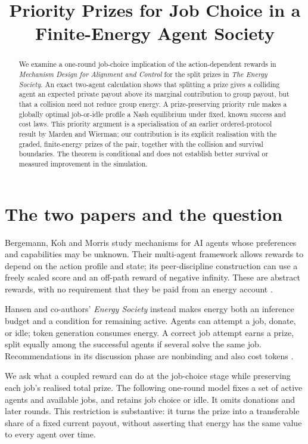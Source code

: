 \documentclass{article}
\title{Priority Prizes for Job Choice in a Finite-Energy Agent Society}
\begin{document}
\maketitle

\begin{abstract}
We examine a one-round job-choice implication of the action-dependent rewards in \emph{Mechanism Design for Alignment and Control} for the split prizes in \emph{The Energy Society}. An exact two-agent calculation shows that splitting a prize gives a colliding agent an expected private payout above its marginal contribution to group payout, but that a collision need not reduce group energy. A prize-preserving priority rule makes a globally optimal job-or-idle profile a Nash equilibrium under fixed, known success and cost laws. This priority argument is a specialisation of an earlier ordered-protocol result by Marden and Wierman; our contribution is its explicit realisation with the graded, finite-energy prizes of the pair, together with the collision and survival boundaries. The theorem is conditional and does not establish better survival or measured improvement in the simulation. %
\end{abstract}

\section{The two papers and the question}

Bergemann, Koh and Morris study mechanisms for AI agents whose preferences and capabilities may be unknown. Their multi-agent framework allows rewards to depend on the action profile and state; its peer-discipline construction can use a freely scaled score and an off-path reward of negative infinity. These are abstract rewards, with no requirement that they be paid from an energy account \cite{bergemann2026mechanism}. %

Hansen and co-authors' \emph{Energy Society} instead makes energy both an inference budget and a condition for remaining active. Agents can attempt a job, donate, or idle; token generation consumes energy. A correct job attempt earns a prize, split equally among the successful agents if several solve the same job. Recommendations in its discussion phase are nonbinding and also cost tokens \cite{hansen2026energy}. %

We ask what a coupled reward can do at the job-choice stage while preserving each job's realised total prize. The following one-round model fixes a set of active agents and available jobs, and retains job choice or idle. It omits donations and later rounds. This restriction is substantive: it turns the prize into a transferable share of a fixed current payout, without asserting that energy has the same value to every agent over time. %
\end{document}
